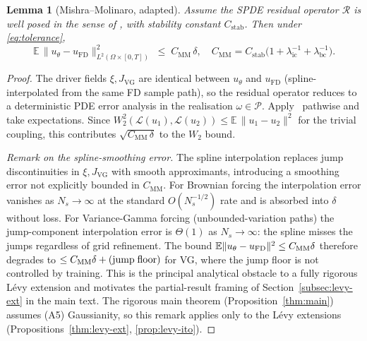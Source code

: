 \documentclass[review,12pt]{elsarticle}
\newtheorem{lemma}{Lemma}
\begin{document}
\begin{lemma}[Mishra--Molinaro, adapted]
\label{lem:mm}
Assume the SPDE residual operator \(\mathcal R\) is well posed in the
sense of \cite[Thm.~3.4]{MishraMolinaro2022}, with stability constant
\(C_{\mathrm{stab}}\). Then under \eqref{eq:tolerance},
\[
\mathbb E\,\|u_\theta - u_{\mathrm{FD}}\|^2_{L^2(\Omega \times [0,T])}
\;\le\; C_{\mathrm{MM}}\,\delta,
\quad
C_{\mathrm{MM}} = C_{\mathrm{stab}}
\bigl(1 + \lambda_{\mathrm{ic}}^{-1}
+ \lambda_{\mathrm{bc}}^{-1}\bigr).
\]
\end{lemma}
\begin{proof}
The driver fields \(\xi, J_{\mathrm{VG}}\) are identical between
\(u_\theta\) and \(u_{\mathrm{FD}}\) (spline-interpolated from the
same FD sample path), so the residual operator reduces to a
deterministic PDE error analysis in the realisation
\(\omega \in \mathcal P\). Apply~\cite[Thm.~3.4]{MishraMolinaro2022}
pathwise and take expectations. Since
\(W_2^2(\mathcal L(u_1), \mathcal L(u_2))
\le \mathbb E\,\|u_1 - u_2\|^2\) for the trivial coupling, this
contributes \(\sqrt{C_{\mathrm{MM}}\,\delta}\) to the \(W_2\) bound.

\emph{Remark on the spline-smoothing error.} The spline
interpolation replaces jump discontinuities in
\(\xi, J_{\mathrm{VG}}\) with smooth approximants, introducing a
smoothing error not explicitly bounded in \(C_{\mathrm{MM}}\). For
Brownian forcing the interpolation error vanishes as $N_s \to
\infty$ at the standard $O(N_s^{-1/2})$ rate and is absorbed into
$\delta$ without loss. For Variance-Gamma forcing
(unbounded-variation paths) the jump-component interpolation error
is $\Theta(1)$ as $N_s \to \infty$: the spline misses the jumps
regardless of grid refinement. The bound
$\mathbb E\|u_\theta - u_{\mathrm{FD}}\|^2 \le C_{\rm MM}\delta$
therefore degrades to
$\le C_{\rm MM}\delta + \mathrm{(jump\;floor)}$ for VG, where the
jump floor is not controlled by training. This is the principal
analytical obstacle to a fully rigorous L\'evy extension and
motivates the partial-result framing of
Section~\ref{subsec:levy-ext} in the main text. The rigorous main
theorem (Proposition~\ref{thm:main}) assumes (A5) Gaussianity, so
this remark applies only to the L\'evy extensions
(Propositions~\ref{thm:levy-ext}, \ref{prop:levy-ito}).
\end{proof}
\end{document}
